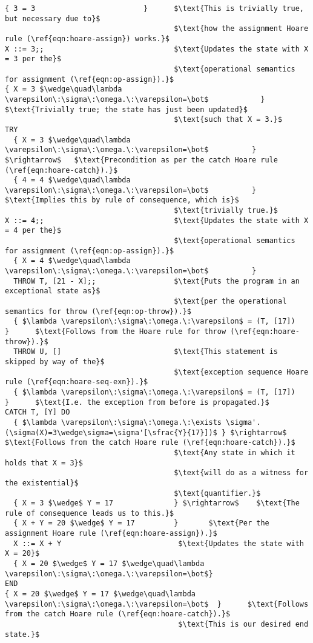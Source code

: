 \begin{lstlisting}[mathescape=true,keepspaces=true,label=lst:hoare_ex_asgn,caption=A small program demonstrating a try-catch statement.]
{ 3 = 3                         }      $\text{This is trivially true, but necessary due to}$
                                       $\text{how the assignment Hoare rule (\ref{eqn:hoare-assign}) works.}$
X ::= 3;;                              $\text{Updates the state with X = 3 per the}$
                                       $\text{operational semantics for assignment (\ref{eqn:op-assign}).}$
{ X = 3 $\wedge\quad\lambda \varepsilon\:\sigma\:\omega.\:\varepsilon=\bot$            }      $\text{Trivially true; the state has just been updated}$
                                       $\text{such that X = 3.}$
TRY
  { X = 3 $\wedge\quad\lambda \varepsilon\:\sigma\:\omega.\:\varepsilon=\bot$          } $\rightarrow$   $\text{Precondition as per the catch Hoare rule (\ref{eqn:hoare-catch}).}$
  { 4 = 4 $\wedge\quad\lambda \varepsilon\:\sigma\:\omega.\:\varepsilon=\bot$          }      $\text{Implies this by rule of consequence, which is}$
                                       $\text{trivially true.}$
X ::= 4;;                              $\text{Updates the state with X = 4 per the}$
                                       $\text{operational semantics for assignment (\ref{eqn:op-assign}).}$
  { X = 4 $\wedge\quad\lambda \varepsilon\:\sigma\:\omega.\:\varepsilon=\bot$          }
  THROW T, [21 - X];;                  $\text{Puts the program in an exceptional state as}$
                                       $\text{per the operational semantics for throw (\ref{eqn:op-throw}).}$
  { $\lambda \varepsilon\:\sigma\:\omega.\:\varepsilon$ = (T, [17])          }      $\text{Follows from the Hoare rule for throw (\ref{eqn:hoare-throw}).}$
  THROW U, []                          $\text{This statement is skipped by way of the}$
                                       $\text{exception sequence Hoare rule (\ref{eqn:hoare-seq-exn}).}$
  { $\lambda \varepsilon\:\sigma\:\omega.\:\varepsilon$ = (T, [17])          }      $\text{I.e. the exception from before is propagated.}$
CATCH T, [Y] DO
  { $\lambda \varepsilon\:\sigma\:\omega.\:\exists \sigma'.(\sigma(X)=3\wedge\sigma=\sigma'[\sfrac{Y}{17}])$ } $\rightarrow$    $\text{Follows from the catch Hoare rule (\ref{eqn:hoare-catch}).}$
                                       $\text{Any state in which it holds that X = 3}$
                                       $\text{will do as a witness for the existential}$
                                       $\text{quantifier.}$
  { X = 3 $\wedge$ Y = 17              } $\rightarrow$    $\text{The rule of consequence leads us to this.}$
  { X + Y = 20 $\wedge$ Y = 17         }       $\text{Per the assignment Hoare rule (\ref{eqn:hoare-assign}).}$
  X ::= X + Y                           $\text{Updates the state with X = 20}$
  { X = 20 $\wedge$ Y = 17 $\wedge\quad\lambda \varepsilon\:\sigma\:\omega.\:\varepsilon=\bot$}
END
{ X = 20 $\wedge$ Y = 17 $\wedge\quad\lambda \varepsilon\:\sigma\:\omega.\:\varepsilon=\bot$  }      $\text{Follows from the catch Hoare rule (\ref{eqn:hoare-catch}).}$
                                        $\text{This is our desired end state.}$
\end{lstlisting}